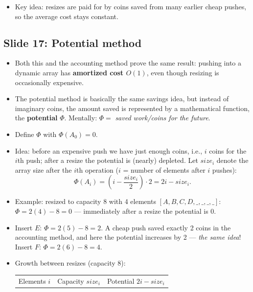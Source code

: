 \documentclass[11pt]{article}
\newcommand{\slide}[2]{\subsection*{Slide #1: #2}}
\begin{document}
\begin{itemize}
  \begin{enumerate}
    \item \textbf{Resize + copy:} create a new array of size 8 and copy the 4 elements --- copying costs 4 operations, paid using the saved coins.
    \item \textbf{Insert 5th element:} put it into the new array (cost 1 coin).
    \item \textbf{Save again:} from the 3 coins charged, after paying 1, save 2 coins (toward the next resize).
  \end{enumerate}
  \item Key idea: resizes are paid for by coins saved from many earlier cheap pushes, so the average cost stays constant.
\end{itemize}

\slide{17}{Potential method}
\begin{itemize}
  \item Both this and the accounting method prove the same result: pushing into a dynamic array has \textbf{amortized cost $O(1)$}, even though resizing is occasionally expensive.
  \item The potential method is basically the same savings idea, but instead of imaginary coins, the amount saved is represented by a mathematical function, the \textbf{potential} $\Phi$. Mentally: $\Phi = $ \emph{saved work/coins for the future}.
  \item Define $\Phi$ with $\Phi(A_0) = 0$.
  \item Idea: before an expensive push we have just enough coins, i.e., $i$ coins for the $i$th push; after a resize the potential is (nearly) depleted. Let $size_i$ denote the array size after the $i$th operation ($i$ = number of elements after $i$ pushes):
        \[ \Phi(A_i) = \left( i - \frac{size_i}{2} \right) \cdot 2 = 2i - size_i. \]
  \item Example: resized to capacity 8 with 4 elements $[A,B,C,D,\_,\_,\_,\_]$: $\Phi = 2(4) - 8 = 0$ --- immediately after a resize the potential is $0$.
  \item Insert $E$: $\Phi = 2(5) - 8 = 2$. A cheap push saved exactly 2 coins in the accounting method, and here the potential increases by 2 --- \emph{the same idea}! Insert $F$: $\Phi = 2(6) - 8 = 4$.
  \item Growth between resizes (capacity 8):
        \begin{center}
        \begin{tabular}{ccc}
          \hline
          Elements $i$ & Capacity $size_i$ & Potential $2i - size_i$ \\

\end{tabular}
\end{center}
\end{itemize}
\end{document}
